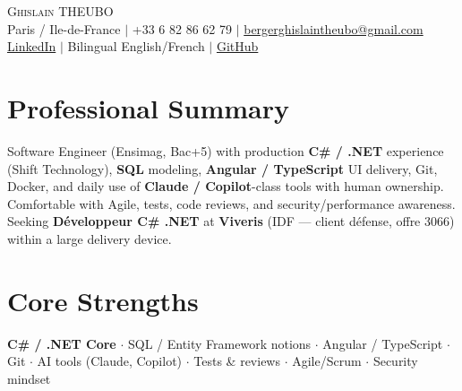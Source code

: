 \documentclass[letterpaper,10.5pt]{article}
\begin{document}
\begin{center}
{\Huge \scshape Ghislain THEUBO} \\ \vspace{2pt}
\small Paris / Ile-de-France $|$ +33 6 82 86 62 79 $|$ \href{mailto:bergerghislaintheubo@gmail.com}{bergerghislaintheubo@gmail.com} \\
\href{https://www.linkedin.com/in/berger-ghislain}{LinkedIn} $|$ Bilingual English/French $|$ \href{https://github.com/Bergerghislain}{GitHub}
\end{center}
\vspace{-6pt}
\section{Professional Summary}
\small{Software Engineer (Ensimag, Bac+5) with production \textbf{C\# / .NET} experience (Shift Technology), \textbf{SQL} modeling, \textbf{Angular / TypeScript} UI delivery, Git, Docker, and daily use of \textbf{Claude / Copilot}-class tools with human ownership. Comfortable with Agile, tests, code reviews, and security/performance awareness. Seeking \textbf{D\'eveloppeur C\# .NET} at \textbf{Viveris} (IDF --- client d\'efense, offre 3066) within a large delivery device.}
\section{Core Strengths}
\small{\textbf{C\# / .NET Core} $\cdot$ SQL / Entity Framework notions $\cdot$ Angular / TypeScript $\cdot$ Git $\cdot$ AI tools (Claude, Copilot) $\cdot$ Tests \& reviews $\cdot$ Agile/Scrum $\cdot$ Security mindset}
\end{document}
